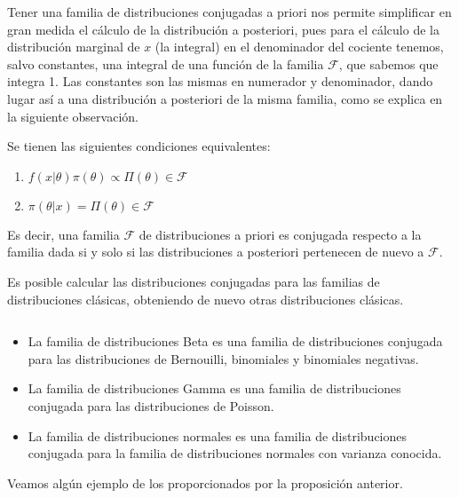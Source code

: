 \documentclass{article}
\begin{document}
Tener una familia de distribuciones conjugadas a priori nos permite simplificar en gran medida el cálculo de la distribución a posteriori, pues para el cálculo de la distribución marginal de $x$ (la integral) en el denominador del cociente tenemos, salvo constantes, una integral de una función de la familia $\mathcal{F}$, que sabemos que integra 1. Las constantes son las mismas en numerador y denominador, dando lugar así a una distribución a posteriori de la misma familia, como se explica en la siguiente observación.

\begin{remark}
	Se tienen las siguientes condiciones equivalentes:
	\begin{enumerate}%
		\item $f(x|\theta)\pi(\theta) \propto \Pi(\theta) \in \mathcal{F}$
		\item $\pi(\theta|x)=\Pi(\theta)\in\mathcal{F}$
	\end{enumerate}
	Es decir, una familia $\mathcal{F}$ de distribuciones a priori es conjugada respecto a la familia dada si y solo si las distribuciones a posteriori pertenecen de nuevo a $\mathcal{F}$.
\end{remark}

Es posible calcular las distribuciones conjugadas para las familias de distribuciones clásicas, obteniendo de nuevo otras distribuciones clásicas.

\begin{prop}
	$ $ \newline
	\begin{itemize}
		\item La familia de distribuciones Beta es una familia de distribuciones conjugada para las distribuciones de Bernouilli, binomiales y binomiales negativas.

		\item La familia de distribuciones Gamma es una familia de distribuciones conjugada para las distribuciones de Poisson.%

		\item La familia de distribuciones normales es una familia de distribuciones conjugada para la familia de distribuciones normales con varianza conocida.
	\end{itemize}
\end{prop}

Veamos algún ejemplo de los proporcionados por la proposición anterior.
\end{document}
